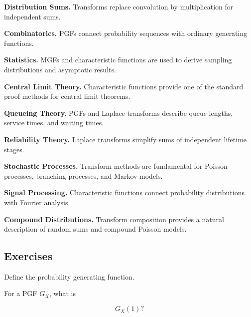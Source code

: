 \begin{applicationbox}

\textbf{Distribution Sums.}
Transforms replace convolution by multiplication for independent sums.

\medskip

\textbf{Combinatorics.}
PGFs connect probability sequences with ordinary generating functions.

\medskip

\textbf{Statistics.}
MGFs and characteristic functions are used to derive sampling
distributions and asymptotic results.

\medskip

\textbf{Central Limit Theory.}
Characteristic functions provide one of the standard proof methods for
central limit theorems.

\medskip

\textbf{Queueing Theory.}
PGFs and Laplace transforms describe queue lengths, service times, and
waiting times.

\medskip

\textbf{Reliability Theory.}
Laplace transforms simplify sums of independent lifetime stages.

\medskip

\textbf{Stochastic Processes.}
Transform methods are fundamental for Poisson processes, branching
processes, and Markov models.

\medskip

\textbf{Signal Processing.}
Characteristic functions connect probability distributions with Fourier
analysis.

\medskip

\textbf{Compound Distributions.}
Transform composition provides a natural description of random sums and
compound Poisson models.

\end{applicationbox}

\subsection{Exercises}
\label{subsec:probability-transforms-exercises}

\begin{exercise}[1]
Define the probability generating function.
\end{exercise}

\begin{exercise}[1]
For a PGF \(G_X\), what is

\[
G_X(1)?
\]
\end{exercise}

